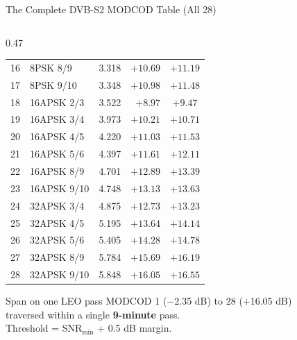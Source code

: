 \documentclass[aspectratio=169,10pt]{beamer}
\begin{document}
\begin{frame}{The Complete DVB-S2 MODCOD Table (All 28)}
\begin{columns}[T]
\begin{column}{0.47\textwidth}
{\begin{tabular}{clrrc}
        \midrule
        \rowcolor{NUSorange!10}
        16 & 8PSK 8/9  & 3.318 & $+10.69$ & $+11.19$ \\
        \rowcolor{NUSorange!10}
        17 & 8PSK 9/10 & 3.348 & $+10.98$ & $+11.48$ \\
        \midrule
        \rowcolor{NUSgreen!10}
        18 & 16APSK 2/3 & 3.522 & $+8.97$ & $+9.47$ \\
        \rowcolor{NUSgreen!10}
        19 & 16APSK 3/4 & 3.973 & $+10.21$ & $+10.71$ \\
        \rowcolor{NUSgreen!10}
        20 & 16APSK 4/5 & 4.220 & $+11.03$ & $+11.53$ \\
        \rowcolor{NUSgreen!10}
        21 & 16APSK 5/6 & 4.397 & $+11.61$ & $+12.11$ \\
        \rowcolor{NUSgreen!10}
        22 & 16APSK 8/9 & 4.701 & $+12.89$ & $+13.39$ \\
        \rowcolor{NUSgreen!10}
        23 & 16APSK 9/10& 4.748 & $+13.13$ & $+13.63$ \\
        \midrule
        \rowcolor{NUSred!10}
        24 & 32APSK 3/4 & 4.875 & $+12.73$ & $+13.23$ \\
        \rowcolor{NUSred!10}
        25 & 32APSK 4/5 & 5.195 & $+13.64$ & $+14.14$ \\
        \rowcolor{NUSred!10}
        26 & 32APSK 5/6 & 5.405 & $+14.28$ & $+14.78$ \\
        \rowcolor{NUSred!10}
        27 & 32APSK 8/9 & 5.784 & $+15.69$ & $+16.19$ \\
        \rowcolor{NUSred!10}
        28 & 32APSK 9/10& 5.848 & $+16.05$ & $+16.55$ \\
        \bottomrule
      \end{tabular}}
      \vspace{0.3em}
      \begin{keybox}{Span on one LEO pass}
        \scriptsize MODCOD 1 ($-$2.35 dB) to 28 (+16.05 dB)\\
        traversed within a single \textbf{9-minute} pass.\\
        Threshold = SNR$_{\min}$ + 0.5 dB margin.
      \end{keybox}
    \end{column}
  \end{columns}
\end{frame}
\end{document}
